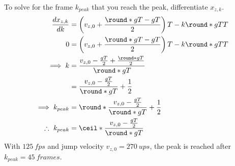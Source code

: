 To solve for the frame $k_{peak}$ that you reach the peak, differentiate $x_{z,k}$.
\begin{align}
\nonumber
\frac{\diff x_{z,k}}{\diff k} &= \left(v_{z,0} + \frac{\round*{gT} - gT}{2} \right) T - k\round*{gT} T\\\nonumber
0 &= \left(v_{z,0} + \frac{\round*{gT} - gT}{2} \right) T - k\round*{gT} T\\\nonumber
\implies k &= \frac{v_{z,0} - \frac{gT}{2} + \frac{\round*{gT}}{2}}{\round*{gT}}\\\nonumber
&= \frac{v_{z,0} - \frac{gT}{2}}{\round*{gT}} + \frac{1}{2}\\\nonumber
\implies k_{peak} &= \round*{\frac{v_{z,0} - \frac{gT}{2}}{\round*{gT}} + \frac{1}{2}}\\
\therefore\ k_{peak} &= \ceil*{\frac{v_{z,0} - \frac{gT}{2}}{\round*{gT}}}
\end{align}
With $\qty{125}{fps}$ and jump velocity $v_{z,0} = \qty{270}{ups}$, the peak is reached after $k_{peak} = \qty{45}{frames}$.\\

